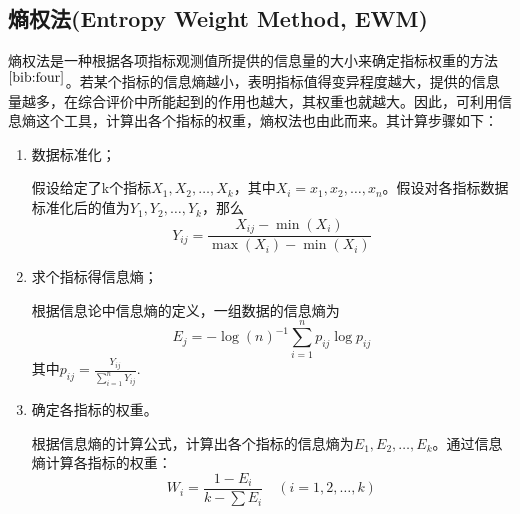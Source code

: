 \documentclass[bwprint]{cumcmthesis}
\begin{document}
        \subsection{熵权法(Entropy Weight Method, EWM)}
        熵权法是一种根据各项指标观测值所提供的信息量的大小来确定指标权重的方法$^{\cite{bib:four}}$。若某个指标的信息熵越小，表明指标值得变异程度越大，提供的信息量越多，在综合评价中所能起到的作用也越大，其权重也就越大。因此，可利用信息熵这个工具，计算出各个指标的权重，熵权法也由此而来。其计算步骤如下：
        \begin{enumerate}
            \item 数据标准化；
            
            假设给定了k个指标$X_1,X_2,\dots,X_k$，其中$X_i = {x_1,x_2,\dots,x_n}$。假设对各指标数据标准化后的值为$Y_1,Y_2,\dots,Y_k$，那么
            \begin{equation}
                \label{eq:EWM1}
                Y_{ij} = \frac{X_{ij}-\min(X_i)}{\max(X_i)-\min(X_i)}
            \end{equation}

            \item 求个指标得信息熵；
            
            根据信息论中信息熵的定义，一组数据的信息熵为
            \begin{equation}
                \label{eq:EWM2}
                E_j = -\log(n)^{-1}\sum_{i=1}^{n}p_{ij}\log p_{ij}
            \end{equation}
            其中$p_{ij} = \frac{Y_{ij}}{\sum_{i=1}^{n}Y_{ij}}$.
            \item 确定各指标的权重。
            
            根据信息熵的计算公式，计算出各个指标的信息熵为$E_1,E_2,\dots,E_k$。通过信息熵计算各指标的权重：
            \begin{equation}
                \label{eq:EWM3}
                W_i = \frac{1-E_i}{k-\sum E_i}\quad (i = 1,2,\dots,k)
            \end{equation}
        \end{enumerate}
        
\end{document}

